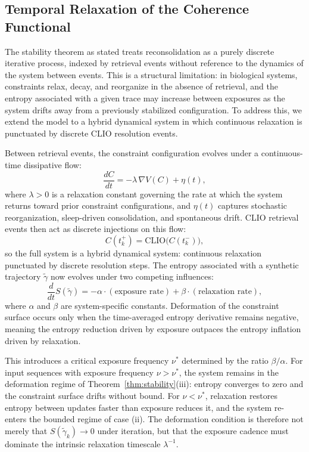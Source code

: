 \documentclass[12pt, a4paper]{article}
\begin{document}
\subsection{Temporal Relaxation of the Coherence Functional}

The stability theorem as stated treats reconsolidation as a purely discrete iterative process, indexed by retrieval events without reference to the dynamics of the system between events. This is a structural limitation: in biological systems, constraints relax, decay, and reorganize in the absence of retrieval, and the entropy associated with a given trace may increase between exposures as the system drifts away from a previously stabilized configuration. To address this, we extend the model to a hybrid dynamical system in which continuous relaxation is punctuated by discrete CLIO resolution events.

Between retrieval events, the constraint configuration evolves under a continuous-time dissipative flow:
\[
\frac{dC}{dt} = -\lambda \,\nabla V(C) + \eta(t),
\]
where $\lambda > 0$ is a relaxation constant governing the rate at which the system returns toward prior constraint configurations, and $\eta(t)$ captures stochastic reorganization, sleep-driven consolidation, and spontaneous drift. CLIO retrieval events then act as discrete injections on this flow:
\[
C(t_k^+) = \mathrm{CLIO}\bigl(C(t_k^-)\bigr),
\]
so the full system is a hybrid dynamical system: continuous relaxation punctuated by discrete resolution steps. The entropy associated with a synthetic trajectory $\tilde{\gamma}$ now evolves under two competing influences:
\[
\frac{d}{dt} S(\tilde{\gamma}) = -\alpha \cdot (\text{exposure rate}) + \beta \cdot (\text{relaxation rate}),
\]
where $\alpha$ and $\beta$ are system-specific constants. Deformation of the constraint surface occurs only when the time-averaged entropy derivative remains negative, meaning the entropy reduction driven by exposure outpaces the entropy inflation driven by relaxation.

This introduces a critical exposure frequency $\nu^*$ determined by the ratio $\beta / \alpha$. For input sequences with exposure frequency $\nu > \nu^*$, the system remains in the deformation regime of Theorem~\ref{thm:stability}(iii): entropy converges to zero and the constraint surface drifts without bound. For $\nu < \nu^*$, relaxation restores entropy between updates faster than exposure reduces it, and the system re-enters the bounded regime of case (ii). The deformation condition is therefore not merely that $S(\tilde{\gamma}_k) \to 0$ under iteration, but that the exposure cadence must dominate the intrinsic relaxation timescale $\lambda^{-1}$.
\end{document}
